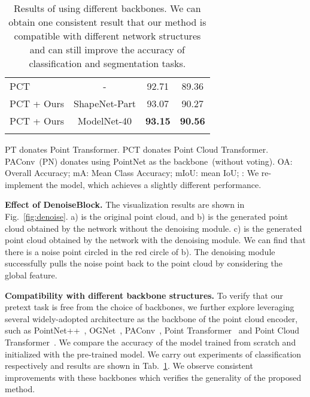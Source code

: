 \documentclass[journal]{IEEEtran}
\begin{document}
\begin{table}[t]
\begin{center}
{\begin{tabular}{l|c|c|c}
\hline
{\color{black}PCT} ~\cite{guo2021pct} & {\color{black}-} & {\color{black}92.71} & {\color{black}89.36} \\
{\color{black}PCT + Ours}  & {\color{black}ShapeNet-Part} & {\color{black}93.07} & {\color{black}90.27} \\
{\color{black}PCT + Ours} & {\color{black}ModelNet-40} & {\color{black}\textbf{93.15}} & {\color{black}\textbf{90.56}} \\
\shline
\end{tabular}}
\end{center}
\caption{
Results of using 
different backbones.
We can obtain one consistent result that our method is compatible with different network structures and can still improve the accuracy of classification and segmentation tasks.
} 
\footnotesize{
PT donates Point Transformer. PCT donates Point Cloud Transformer. PAConv~(PN) donates using PointNet as the backbone~(without voting).
OA: Overall Accuracy;
mA: Mean Class Accuracy;
mIoU: mean IoU;
: We re-implement the model,
which achieves a slightly different performance.
}
\label{table:pointnet2}
\end{table}






\textbf{Effect of DenoiseBlock.} The visualization results are shown in  Fig.~\ref{fig:denoise}. a) is the original point cloud, and b) is the generated point cloud obtained by the network without the denoising module. c) is the generated point cloud obtained by the network with the denoising module. We can find that there is a noise point circled in the red circle of b). The denoising module successfully pulls the noise point back to the point cloud by considering the global feature. 

\textbf{Compatibility with different backbone structures.} To verify that our pretext task is free from the choice of backbones, we further explore leveraging several widely-adopted architecture as the backbone of the point cloud encoder, such as PointNet++~\cite{qi2017pointnet++}, OGNet~\cite{zheng2020parameter}, PAConv~\cite{xu2021paconv}, Point Transformer~\cite{zhao2021point} and Point Cloud Transformer~\cite{guo2021pct}.
We compare the accuracy of the model trained from scratch and initialized with the pre-trained model. We carry out experiments of classification respectively and results are shown in Tab.~\ref{table:pointnet2}. We observe consistent improvements with these backbones which verifies the generality of the proposed method. 
\end{document}
